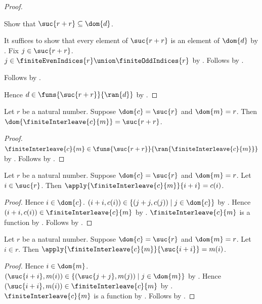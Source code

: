 \begin{proof}
\begin{subproof}
        Show that $\suc{r+r}\subseteq\dom{d}$.
        \begin{subproof}
            It suffices to show that every element of $\suc{r+r}$ is an
                element of $\dom{d}$ by .
            Fix $j\in\suc{r+r}$.
            $j\in\finiteEvenIndices{r}\union\finiteOddIndices{r}$
                by .
            Follows by
                .
        \end{subproof}
        Follows by .
    \end{subproof}
    Hence $d\in\funs{\suc{r+r}}{\ran{d}}$
        by .
\end{proof}

\begin{proposition}\label{finite_interleave_domain}
    Let $r$ be a natural number.
    Suppose $\dom{c}=\suc{r}$ and $\dom{m}=r$.
    Then $\dom{\finiteInterleave{c}{m}}=\suc{r+r}$.
\end{proposition}
\begin{proof}
    $\finiteInterleave{c}{m}\in
        \funs{\suc{r+r}}{\ran{\finiteInterleave{c}{m}}}$
        by .
    Follows by .
\end{proof}

\begin{proposition}\label{finite_interleave_even}
    Let $r$ be a natural number.
    Suppose $\dom{c}=\suc{r}$ and $\dom{m}=r$.
    Let $i\in\suc{r}$.
    Then $\apply{\finiteInterleave{c}{m}}{i+i}=c(i)$.
\end{proposition}
\begin{proof}
    Hence $i\in\dom{c}$.
    $(i+i,c(i))\in\{(j+j,c(j))\mid j\in\dom{c}\}$
        by \auto.
    Hence $(i+i,c(i))\in\finiteInterleave{c}{m}$
        by .
    $\finiteInterleave{c}{m}$ is a function
        by .
    Follows by .
\end{proof}

\begin{proposition}\label{finite_interleave_odd}
    Let $r$ be a natural number.
    Suppose $\dom{c}=\suc{r}$ and $\dom{m}=r$.
    Let $i\in r$.
    Then $\apply{\finiteInterleave{c}{m}}{\suc{i+i}}=m(i)$.
\end{proposition}
\begin{proof}
    Hence $i\in\dom{m}$.
    $(\suc{i+i},m(i))
        \in\{(\suc{j+j},m(j))\mid j\in\dom{m}\}$
        by \auto.
    Hence $(\suc{i+i},m(i))\in\finiteInterleave{c}{m}$
        by .
    $\finiteInterleave{c}{m}$ is a function
        by .
    Follows by .
\end{proof}

